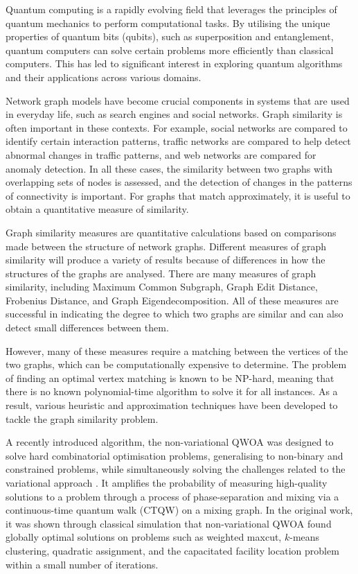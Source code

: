 Quantum computing is a rapidly evolving field that leverages the principles of quantum mechanics to perform computational tasks. By utilising the unique properties of quantum bits (qubits), such as superposition and entanglement, quantum computers can solve certain problems more efficiently than classical computers. This has led to significant interest in exploring quantum algorithms and their applications across various domains.

Network graph models have become crucial components in systems that are used in everyday life, such as search engines and social networks. Graph similarity is often important in these contexts. For example, social networks are compared to identify certain interaction patterns, traffic networks are compared to help detect abnormal changes in traffic patterns, and web networks are compared for anomaly detection. In all these cases, the similarity between two graphs with overlapping sets of nodes is assessed, and the detection of changes in the patterns of connectivity is important. For graphs that match approximately, it is useful to obtain a quantitative measure of similarity.

Graph similarity measures are quantitative calculations based on comparisons made between the structure of network graphs. Different measures of graph similarity will produce a variety of results because of differences in how the structures of the graphs are analysed. There are many measures of graph similarity, including Maximum Common Subgraph, Graph Edit Distance, Frobenius Distance, and Graph Eigendecomposition. All of these measures are successful in indicating the degree to which two graphs are similar and can also detect small differences between them.

However, many of these measures require a matching between the vertices of the two graphs, which can be computationally expensive to determine. The problem of finding an optimal vertex matching is known to be NP-hard, meaning that there is no known polynomial-time algorithm to solve it for all instances. As a result, various heuristic and approximation techniques have been developed to tackle the graph similarity problem.

A recently introduced algorithm, the non-variational QWOA was designed to solve hard combinatorial optimisation problems, generalising to non-binary and constrained problems, while simultaneously solving the challenges related to the variational approach \cite{bennett2024nonvariational}. It amplifies the probability of measuring high-quality solutions to a problem through a process of phase-separation and mixing via a continuous-time quantum walk (CTQW) on a mixing graph. In the original work, it was shown through classical simulation that non-variational QWOA found globally optimal solutions on problems such as weighted maxcut, $k$-means clustering, quadratic assignment, and the capacitated facility location problem within a small number of iterations.

